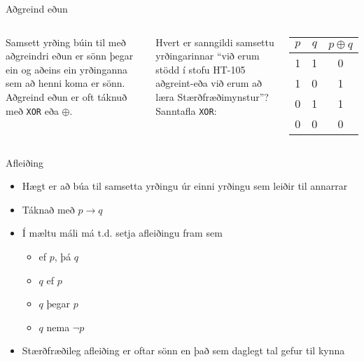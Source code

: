 \documentclass{beamer}
\begin{document}
\begin{frame}{Aðgreind eðun}
\begin{columns}
Samsett yrðing búin til með aðgreindri eðun er sönn þegar ein og aðeins ein yrðinganna sem að henni koma er sönn. Aðgreind eðun er oft táknuð með \texttt{XOR} eða $\oplus$.

\vspace*{0.5cm}
Hvert er sanngildi samsettu yrðingarinnar ``við erum stödd í stofu HT-105 aðgreint-eða við erum að læra Stærðfræðimynstur''?
Sanntafla \texttt{XOR}:
\begin{center}
\begin{tabular}{ccc}
\toprule
$p$&$q$&$p \oplus q$ \\
\midrule
1&1&0\\
1&0&1\\
0&1&1\\
0&0&0\\
\bottomrule
\end{tabular}
\end{center}
\end{columns}
\end{frame}

\begin{frame}{Afleiðing}
\begin{itemize}
 \item Hægt er að búa til samsetta yrðingu úr einni yrðingu sem leiðir til annarrar
 \item Táknað með $p \to q$
 \item Í mæltu máli má t.d. setja afleiðingu fram sem
 \begin{itemize}
  \item ef $p$, þá $q$
  \item $q$ ef $p$
  \item $q$ þegar $p$
  \item $q$ nema $\neg p$
 \end{itemize}
 \item Stærðfræðileg afleiðing er oftar sönn en það sem daglegt tal gefur til kynna
\end{itemize}
\end{frame}
\end{document}
